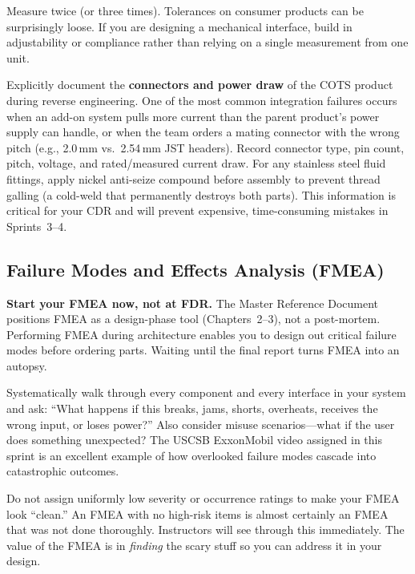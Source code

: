 \documentclass[11pt,letterpaper]{article}
\begin{document}
\begin{protip}
Measure twice (or three times). Tolerances on consumer products can be surprisingly loose. If you are designing a mechanical interface, build in adjustability or compliance rather than relying on a single measurement from one unit.
\end{protip}

\begin{warnbox}
Explicitly document the \textbf{connectors and power draw} of the COTS product during reverse engineering. One of the most common integration failures occurs when an add-on system pulls more current than the parent product's power supply can handle, or when the team orders a mating connector with the wrong pitch (e.g., 2.0\,mm vs.\ 2.54\,mm JST headers). Record connector type, pin count, pitch, voltage, and rated/measured current draw. For any stainless steel fluid fittings, apply nickel anti-seize compound before assembly to prevent thread galling (a cold-weld that permanently destroys both parts). This information is critical for your CDR and will prevent expensive, time-consuming mistakes in Sprints~3--4.
\end{warnbox}

\subsection{Failure Modes and Effects Analysis (FMEA)}

\begin{tipbox}
\textbf{Start your FMEA now, not at FDR.} The Master Reference Document positions FMEA as a design-phase tool (Chapters~2--3), not a post-mortem. Performing FMEA during architecture enables you to design out critical failure modes before ordering parts. Waiting until the final report turns FMEA into an autopsy.
\end{tipbox}

\begin{faqbox}
Systematically walk through every component and every interface in your system and ask: ``What happens if this breaks, jams, shorts, overheats, receives the wrong input, or loses power?'' Also consider misuse scenarios---what if the user does something unexpected? The USCSB ExxonMobil video assigned in this sprint is an excellent example of how overlooked failure modes cascade into catastrophic outcomes.
\end{faqbox}

\begin{warnbox}
Do not assign uniformly low severity or occurrence ratings to make your FMEA look ``clean.'' An FMEA with no high-risk items is almost certainly an FMEA that was not done thoroughly. Instructors will see through this immediately. The value of the FMEA is in \textit{finding} the scary stuff so you can address it in your design.
\end{warnbox}
\end{document}
